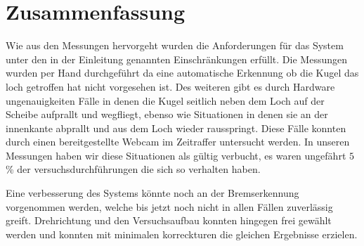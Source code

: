 \chapter{Zusammenfassung} \label{k_zusammenfassung}
Wie aus den Messungen hervorgeht wurden die Anforderungen für das System unter den in der Einleitung genannten Einschränkungen erfüllt.
Die Messungen wurden per Hand durchgeführt da eine automatische Erkennung ob die Kugel das loch getroffen hat nicht vorgesehen ist.
Des weiteren gibt es durch Hardware ungenauigkeiten Fälle in denen die Kugel seitlich neben dem Loch auf der Scheibe aufprallt und wegfliegt, ebenso wie Situationen in denen sie an der innenkante abprallt und aus dem Loch wieder rausspringt.
Diese Fälle konnten durch einen bereitgestellte Webcam im Zeitraffer untersucht werden.
In unseren Messungen haben wir diese Situationen als gültig verbucht, es waren ungefährt $5$\% der versuchsdurchführungen die sich so verhalten haben.

Eine verbesserung des Systems könnte noch an der Bremserkennung vorgenommen werden, welche bis jetzt noch nicht in allen Fällen zuverlässig greift.
Drehrichtung und den Versuchsaufbau konnten hingegen frei gewählt werden und konnten mit minimalen korreckturen die gleichen Ergebnisse erzielen.
